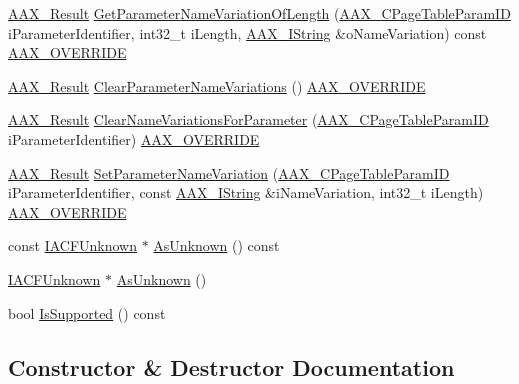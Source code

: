 \begin{DoxyCompactItemize}
\item 
\mbox{\hyperlink{a00392_a4d8f69a697df7f70c3a8e9b8ee130d2f}{A\+A\+X\+\_\+\+Result}} \mbox{\hyperlink{a01929_a4b921a55a35d0a642dbcd4402544f0ee}{Get\+Parameter\+Name\+Variation\+Of\+Length}} (\mbox{\hyperlink{a00392_ab4e01b971dac1b25632fd9f710dd8f77}{A\+A\+X\+\_\+\+C\+Page\+Table\+Param\+ID}} i\+Parameter\+Identifier, int32\+\_\+t i\+Length, \mbox{\hyperlink{a01873}{A\+A\+X\+\_\+\+I\+String}} \&o\+Name\+Variation) const \mbox{\hyperlink{a00392_ac2f24a5172689ae684344abdcce55463}{A\+A\+X\+\_\+\+O\+V\+E\+R\+R\+I\+DE}}
\item 
\mbox{\hyperlink{a00392_a4d8f69a697df7f70c3a8e9b8ee130d2f}{A\+A\+X\+\_\+\+Result}} \mbox{\hyperlink{a01929_a4ec9e2d32eeb51ae589bc2e10c08a03d}{Clear\+Parameter\+Name\+Variations}} () \mbox{\hyperlink{a00392_ac2f24a5172689ae684344abdcce55463}{A\+A\+X\+\_\+\+O\+V\+E\+R\+R\+I\+DE}}
\item 
\mbox{\hyperlink{a00392_a4d8f69a697df7f70c3a8e9b8ee130d2f}{A\+A\+X\+\_\+\+Result}} \mbox{\hyperlink{a01929_a7d1ab121f175fffa26f72e008031ca53}{Clear\+Name\+Variations\+For\+Parameter}} (\mbox{\hyperlink{a00392_ab4e01b971dac1b25632fd9f710dd8f77}{A\+A\+X\+\_\+\+C\+Page\+Table\+Param\+ID}} i\+Parameter\+Identifier) \mbox{\hyperlink{a00392_ac2f24a5172689ae684344abdcce55463}{A\+A\+X\+\_\+\+O\+V\+E\+R\+R\+I\+DE}}
\item 
\mbox{\hyperlink{a00392_a4d8f69a697df7f70c3a8e9b8ee130d2f}{A\+A\+X\+\_\+\+Result}} \mbox{\hyperlink{a01929_a69806d8b27f2c91a5d2d9fbe45accc79}{Set\+Parameter\+Name\+Variation}} (\mbox{\hyperlink{a00392_ab4e01b971dac1b25632fd9f710dd8f77}{A\+A\+X\+\_\+\+C\+Page\+Table\+Param\+ID}} i\+Parameter\+Identifier, const \mbox{\hyperlink{a01873}{A\+A\+X\+\_\+\+I\+String}} \&i\+Name\+Variation, int32\+\_\+t i\+Length) \mbox{\hyperlink{a00392_ac2f24a5172689ae684344abdcce55463}{A\+A\+X\+\_\+\+O\+V\+E\+R\+R\+I\+DE}}
\item 
const \mbox{\hyperlink{a01409}{I\+A\+C\+F\+Unknown}} $\ast$ \mbox{\hyperlink{a01929_af5787f6fe574581a714a6aac6738d855}{As\+Unknown}} () const
\item 
\mbox{\hyperlink{a01409}{I\+A\+C\+F\+Unknown}} $\ast$ \mbox{\hyperlink{a01929_aa6cba81c1036cd3fe0a108800e60ea62}{As\+Unknown}} ()
\item 
bool \mbox{\hyperlink{a01929_af4f8bb73e227aff93f9405e8167c1e1f}{Is\+Supported}} () const
\end{DoxyCompactItemize}


\subsection{Constructor \& Destructor Documentation}
\mbox{\label{a01929_a8a52dc515f5a6975f34ea8dbe0f9059a}} 
